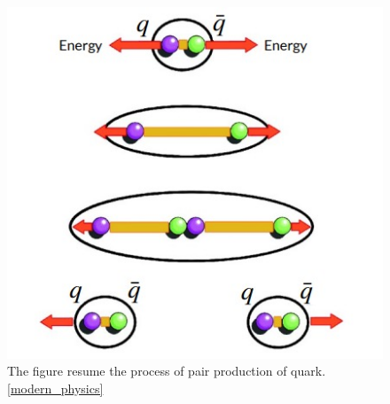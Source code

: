 \documentclass[12pt,a4paper]{book}
\begin{document}
	\begin{figure}		
		\centering
		\includegraphics[width=0.7\linewidth]{pictures/quark_confinement.jpeg}
		\caption{The figure resume the process of pair production of quark. \ref{modern_physics}}
		\label{fig:quark_confinement} 
	\end{figure}
	
\end{document}
